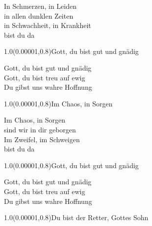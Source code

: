 \documentclass[aspectratio=169]{beamer}
\begin{document}
\color{white}
\begin{frame}
\centering
\color{white}
\huge{In Schmerzen, in Leiden} \\
\huge{in allen dunklen Zeiten} \\
\huge{in Schwachheit, in Krankheit} \\
\huge{bist du da} \\

\begin{textblock}{1.0}(0.00001,0.8)\color{gray}\normalsize{Gott, du bist gut und gnädig}\end{textblock}
\end{frame}

\begin{frame}
\centering
\color{white}
\huge{Gott, du bist gut und gnädig} \\
\huge{Gott, du bist treu auf ewig} \\
\huge{Du gibst uns wahre Hoffnung} \\

\begin{textblock}{1.0}(0.00001,0.8)\color{gray}\normalsize{Im Chaos, in Sorgen}\end{textblock}
\end{frame}

\begin{frame}
\centering
\color{white}
\huge{Im Chaos, in Sorgen} \\
\huge{sind wir in dir geborgen} \\
\huge{Im Zweifel, im Schweigen} \\
\huge{bist du da} \\

\begin{textblock}{1.0}(0.00001,0.8)\color{gray}\normalsize{Gott, du bist gut und gnädig}\end{textblock}
\end{frame}

\begin{frame}
\centering
\color{white}
\huge{Gott, du bist gut und gnädig} \\
\huge{Gott, du bist treu auf ewig} \\
\huge{Du gibst uns wahre Hoffnung} \\

\begin{textblock}{1.0}(0.00001,0.8)\color{gray}\normalsize{Du bist der Retter, Gottes Sohn}\end{textblock}
\end{frame}
\end{document}
